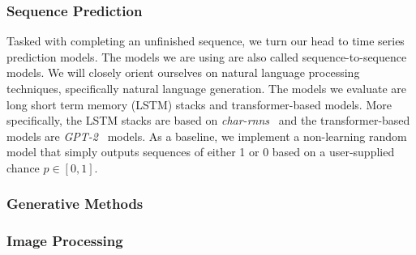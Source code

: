 \subsubsection{Sequence Prediction}

Tasked with completing an unfinished sequence, we turn our head to
time series prediction models. The models we are using are also called
sequence-to-sequence models. We will closely orient ourselves on
natural language processing techniques, specifically natural language
generation. The models we evaluate are long short term memory (LSTM)
stacks and transformer-based models. More specifically, the LSTM
stacks are based on \emph{char-rnns}~\cite{andrejKarpathyCharrnn2019}
and the transformer-based models are
\emph{GPT-2}~\cite{radfordLanguageModelsAre,OpenaiGpt22019} models. As
a baseline, we implement a non-learning random model that simply
outputs sequences of either 1 or 0 based on a user-supplied chance
$p \in [0, 1]$.



\subsubsection{Generative Methods}



\subsubsection{Image Processing}




